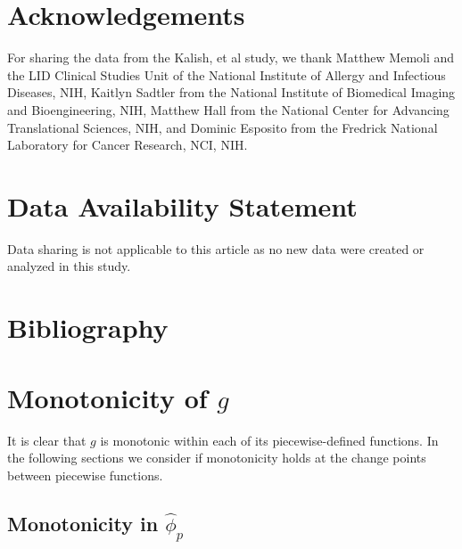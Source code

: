 \documentclass[AMA,STIX1COL]{WileyNJD-v2}
\begin{document}
\section{Acknowledgements}
For sharing the data from the Kalish, et al study, we thank Matthew Memoli and the LID Clinical Studies Unit of the National Institute of Allergy and Infectious Diseases, NIH,  Kaitlyn Sadtler from the National Institute of Biomedical Imaging and Bioengineering, NIH,   Matthew Hall from the National Center for Advancing Translational Sciences, NIH, and Dominic Esposito from the Fredrick National Laboratory for Cancer Research, NCI, NIH.

\section{Data Availability Statement}
Data sharing is not applicable to this article as no new data were created or analyzed in this study.

\section{Bibliography}
\nocite{*}%
%

\appendix

\section{Monotonicity of \( g \)}
\label{monotonicity}
It is clear that \( g \) is monotonic within each of its piecewise-defined functions.
In the following sections we consider if monotonicity holds at the change points between piecewise functions.

\subsection{Monotonicity in \( \hat{\phi}_p \)}
\end{document}
